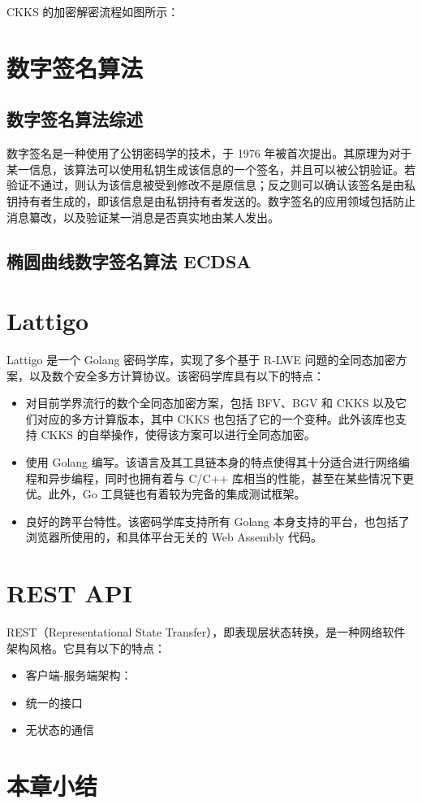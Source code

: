 CKKS 的加密解密流程如图所示：


\section{数字签名算法}

\subsection{数字签名算法综述}

数字签名是一种使用了公钥密码学的技术，于 1976 年被首次提出\cite{1055638}。其原理为对于某一信息，该算法可以使用私钥生成该信息的一个签名，并且可以被公钥验证。若验证不通过，则认为该信息被受到修改不是原信息；反之则可以确认该签名是由私钥持有者生成的，即该信息是由私钥持有者发送的。数字签名的应用领域包括防止消息纂改，以及验证某一消息是否真实地由某人发出。

\subsection{椭圆曲线数字签名算法 ECDSA}

\section{Lattigo}

Lattigo 是一个 Golang 密码学库，实现了多个基于 R-LWE 问题的全同态加密方案，以及数个安全多方计算协议。\cite{Mouchet2020LattigoAM,lattigoRepo}该密码学库具有以下的特点：

\begin{itemize}
    \item 对目前学界流行的数个全同态加密方案，包括 BFV、BGV 和 CKKS 以及它们对应的多方计算版本，其中 CKKS 也包括了它的一个变种\cite{cryptoeprint:2018/952}。此外该库也支持 CKKS 的自举操作，使得该方案可以进行全同态加密。
    \item 使用 Golang 编写。该语言及其工具链本身的特点使得其十分适合进行网络编程和异步编程，同时也拥有着与 C/C++ 库相当的性能，甚至在某些情况下更优。此外，Go 工具链也有着较为完备的集成测试框架。
    \item 良好的跨平台特性。该密码学库支持所有 Golang 本身支持的平台，也包括了浏览器所使用的，和具体平台无关的 Web Assembly 代码。
\end{itemize}



\section{REST API}
REST（Representational State Transfer），即表现层状态转换，是一种网络软件架构风格。它具有以下的特点：

\begin{itemize}
    \item 客户端-服务端架构：
    \item 统一的接口
    \item 无状态的通信
\end{itemize}

\section{本章小结}

